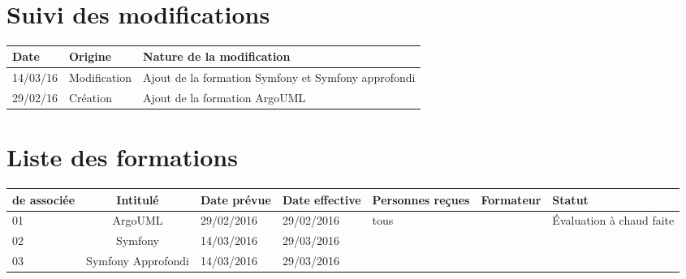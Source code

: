 \documentclass[asi,sansVersion]{picInsa}
\begin{document}
	\begin{center}
		\LARGE
		\textsc{
			\PF{}\\
		}
	\end{center}
	\vspace{0.5cm}

	\section*{Suivi des modifications}
	\begin{table}[H]
		\centering
		\begin{tabularx}{18cm}{|p{1.7cm}|p{4cm}|X|}
		\hline
		\rowcolor[gray]{0.85} Date & Origine & Nature de la modification\\\hline
		14/03/16 & Modification & Ajout de la formation Symfony et Symfony approfondi\\ \hline
		29/02/16 & Création & Ajout de la formation ArgoUML\\ \hline
		
		\end{tabularx}
	\end{table}
	
	\section*{Liste des formations}
		\begin{longtable}{|p{2cm}|c|p{2cm}|p{2cm}|p{2cm}|c|p{2cm}|}
			\hline
			\rowcolor{gris2}
			\No{} de \FFCourt{} associée & Intitulé & Date prévue & Date effective & Personnes reçues & Formateur & Statut \\\hline
			01 & ArgoUML & 29/02/2016 & 29/02/2016 & tous & \Julie{} & Évaluation à chaud faite\\\hline
			02 & Symfony & 14/03/2016 & 29/03/2016 &  &  & \\\hline
			03 & Symfony Approfondi & 14/03/2016 & 29/03/2016 &  &  & \\\hline
			
		\end{longtable}
\end{document}

